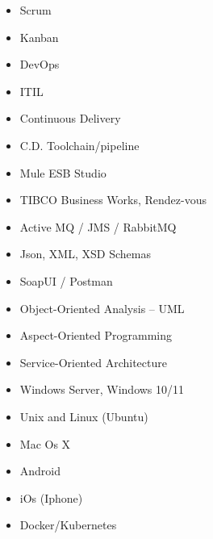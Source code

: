 \begin{cvcolumns}
	{\begin{itemize}
            \item Scrum
            \item Kanban
            \item DevOps
            \item ITIL
            \item Continuous Delivery
            \item C.D. Toolchain/pipeline
    \end{itemize}}
    	{\begin{itemize}
                \item Mule ESB Studio
                \item TIBCO Business Works, Rendez-vous
                \item Active MQ / JMS / RabbitMQ
                \item Json, XML, XSD Schemas
                \item SoapUI / Postman
        \end{itemize}}
\end{cvcolumns}
\begin{cvcolumns}
	{\begin{itemize}
            \item Object-Oriented Analysis – UML
            \item Aspect-Oriented Programming
            \item Service-Oriented Architecture
    \end{itemize}}
	{\begin{itemize}
            \item Windows Server, Windows 10/11
            \item Unix and Linux (Ubuntu)
            \item Mac Os X
            \item Android
            \item iOs (Iphone)
            \item Docker/Kubernetes
    \end{itemize}}
    \end{cvcolumns}
